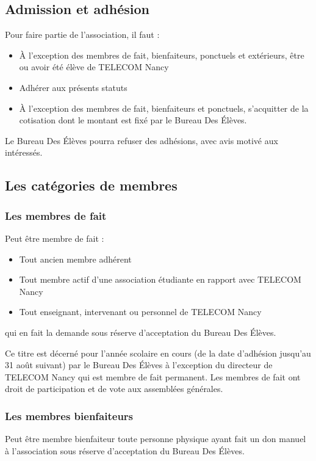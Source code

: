 \documentclass{article} %
\begin{document}
		\subsection{Admission et adhésion}
			Pour faire partie de l'association, il faut :
			\begin{itemize}
				\item À l’exception des membres de fait, bienfaiteurs, ponctuels et
				    extérieurs, être ou avoir été élève de TELECOM Nancy
				\item Adhérer aux présents statuts
				\item À l’exception des membres de fait, bienfaiteurs et ponctuels,
					s'acquitter de la cotisation dont le montant est fixé par le
					Bureau Des Élèves.
			\end{itemize}

			Le Bureau Des Élèves pourra refuser des adhésions, avec avis motivé aux
			intéressés.

		\subsection{Les catégories de membres}
			\subsubsection{Les membres de fait}
				Peut être membre de fait :
				\begin{itemize}
					\item Tout ancien membre adhérent
					\item Tout membre actif d’une association étudiante en rapport
				    	avec TELECOM Nancy
					\item Tout enseignant, intervenant ou personnel de TELECOM Nancy
				\end{itemize}

				qui en fait la demande sous réserve d’acceptation du Bureau Des
				Élèves.

				Ce titre est décerné pour l’année scolaire en cours (de la date
				d’adhésion jusqu’au 31 août suivant) par le Bureau Des Élèves à
				l’exception du directeur de TELECOM Nancy qui est membre de fait
				permanent. Les membres de fait ont droit de participation et de vote
				aux assemblées générales.

			\subsubsection{Les membres bienfaiteurs}
				Peut être membre bienfaiteur toute personne physique ayant fait un
				don manuel à l’association sous réserve d’acceptation du Bureau Des
				Élèves.
\end{document}
